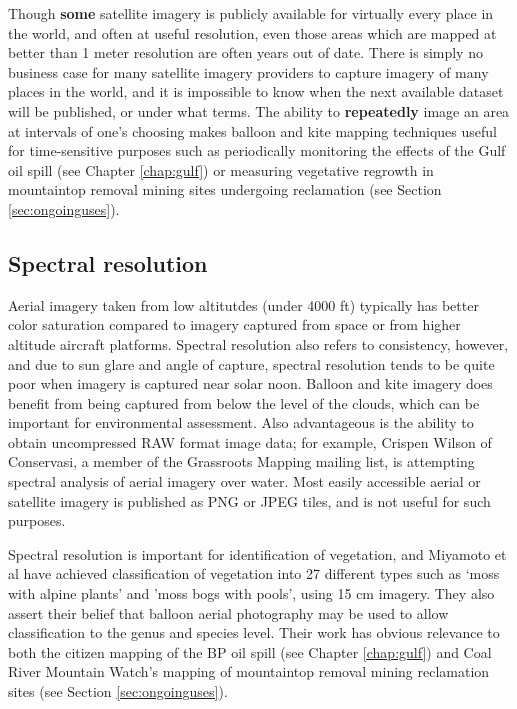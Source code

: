 \documentclass[11pt,oneside,notitlepage]{report}
\begin{document}
Though \textbf{some} satellite imagery is publicly available for virtually every place in the world, and often at useful resolution, even those areas which are mapped at better than 1 meter resolution are often years out of date. There is simply no business case for many satellite imagery providers to capture imagery of many places in the world, and it is impossible to know when the next available dataset will be published, or under what terms. \cite{oconnor2008maps} The ability to \textbf{repeatedly} image an area at intervals of one's choosing makes balloon and kite mapping techniques useful for time-sensitive purposes such as periodically monitoring the effects of the Gulf oil spill (see Chapter \ref{chap:gulf}) or measuring vegetative regrowth in mountaintop removal mining sites undergoing reclamation (see Section \ref{sec:ongoinguses}). 

\subsection{Spectral resolution}

Aerial imagery taken from low altitutdes (under 4000 ft) typically has better color saturation compared to imagery captured from space or from higher altitude aircraft platforms. Spectral resolution also refers to consistency, however, and due to sun glare and angle of capture, spectral resolution tends to be quite poor when imagery is captured near solar noon. Balloon and kite imagery does benefit from being captured from below the level of the clouds, which can be important for environmental assessment. Also advantageous is the ability to obtain uncompressed RAW format image data; for example, Crispen Wilson of Conservasi, a member of the Grassroots Mapping mailing list, is attempting spectral analysis of aerial imagery over water. Most easily accessible aerial or satellite imagery is published as PNG or JPEG tiles, and is not useful for such purposes.  

Spectral resolution is important for identification of vegetation, and Miyamoto et al have achieved classification of vegetation into 27 different types such as `moss with alpine plants' and 'moss bogs with pools', using 15 cm imagery. They also assert their belief that balloon aerial photography may be used to allow classification to the genus and species level. \cite{miyamoto2004use} Their work has obvious relevance to both the citizen mapping of the BP oil spill (see Chapter \ref{chap:gulf}) and Coal River Mountain Watch's mapping of mountaintop removal mining reclamation sites (see Section \ref{sec:ongoinguses}).
\end{document}
